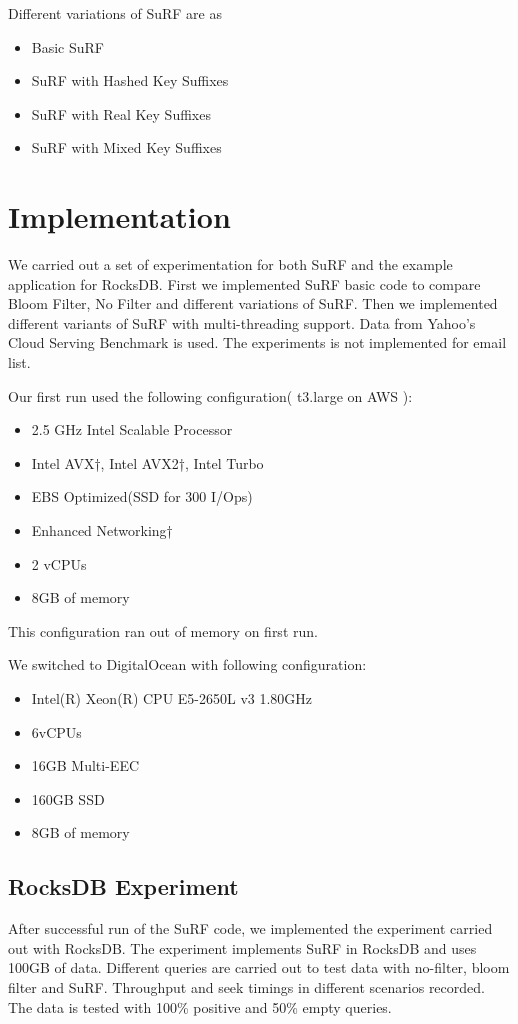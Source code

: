 \documentclass[12pt,conference]{IEEEtran}
\begin{document}
Different variations of SuRF are as
\begin{itemize}
	\item Basic SuRF
	\item SuRF with Hashed Key Suffixes
	\item SuRF with Real Key Suffixes
	\item SuRF with Mixed Key Suffixes
\end{itemize}

\section{Implementation}
We carried out a set of experimentation for both SuRF and the example application for RocksDB.
First we implemented SuRF basic code to compare Bloom Filter, No Filter and different variations of SuRF. Then we implemented different variants of SuRF with multi-threading support. Data from Yahoo's Cloud Serving Benchmark\cite{6} is used. The experiments is not implemented for email list. 

Our first run used the following configuration( t3.large on AWS \cite{5}):

\begin{itemize}
	\item2.5 GHz Intel Scalable Processor
	\item Intel AVX†, Intel AVX2†, Intel Turbo
	\item EBS Optimized(SSD for 300 I/Ops)
	\item Enhanced Networking†
	\item 2 vCPUs
	\item 8GB of memory
\end{itemize}
This configuration ran out of memory on first run. 

We switched to DigitalOcean with following configuration:
\begin{itemize}
	\item Intel(R) Xeon(R) CPU E5-2650L v3 1.80GHz
	\item 6vCPUs
	\item 16GB Multi-EEC 
	\item 160GB SSD
	\item 8GB of memory
\end{itemize}

\subsection{RocksDB Experiment}
After successful run of the SuRF code, we implemented the experiment carried out with RocksDB. The experiment implements SuRF in RocksDB and uses 100GB of data. Different queries are carried out  to test data with no-filter, bloom filter and SuRF. Throughput and seek timings in different scenarios recorded. The data is tested with 100\% positive and 50\% empty queries.
\end{document}
